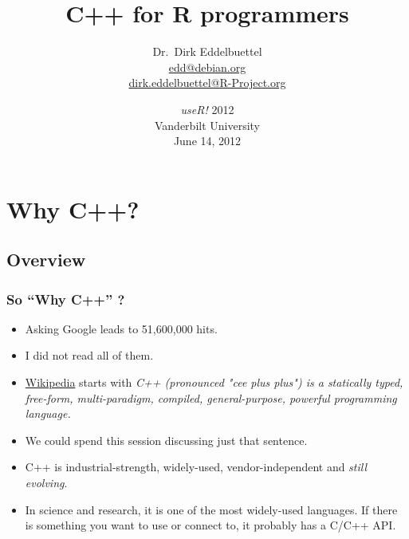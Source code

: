 \documentclass[handout,compress,dvipsnames,pdflatex,beamer]{beamer}
\title{C++ for R programmers}
\author[Dirk Eddelbuettel]{Dr.~Dirk Eddelbuettel\\ \scriptsize\url{edd@debian.org}\\ \url{dirk.eddelbuettel@R-Project.org}}
\date[useR! 2012 @ Vanderbilt]{\textsl{useR!} 2012\\ Vanderbilt University \\ June 14, 2012}
\begin{document}



\section[C++?]{Why C++?}
\subsection{Overview}
\begin{frame}
  \frametitle{So ``Why C++'' ?}
  
  \begin{itemize}
  \item Asking Google leads to 51,600,000 hits.
  \item I did not read all of them.
  \item \href{http://en.wikipedia.org/wiki/C\%2B\%2B}{Wikipedia} starts with
    \emph{C++ (pronounced "cee plus plus") is a statically typed,
      free-form, multi-paradigm, compiled, general-purpose, powerful
      programming language.}  
  \item We could spend this session discussing just that sentence.
  \item C++ is industrial-strength, widely-used, vendor-independent and
    \emph{still evolving}.
  \item In science and research, it is one of the most widely-used
    languages.  If there is something you want to use or connect to, it
    probably has a C/C++ API.
  \end{itemize}
\end{frame}
\end{document}
